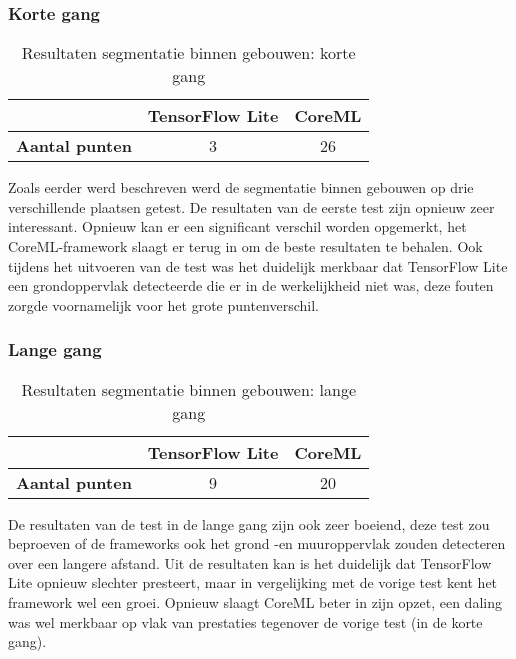 \subsubsection{Korte gang}
\begin{table}[H]
	\centering
	\begin{tabular}{|c|c|c|}
		\hline
		& \textbf{TensorFlow Lite} & \textbf{CoreML} \\ \hline
		\textbf{Aantal punten} & 3                        & 26              \\ \hline
	\end{tabular}
	\caption{Resultaten segmentatie binnen gebouwen: korte gang}
\end{table}
Zoals eerder werd beschreven werd de segmentatie binnen gebouwen op drie verschillende plaatsen getest. De resultaten van de eerste test zijn opnieuw zeer interessant. Opnieuw kan er een significant verschil worden opgemerkt, het CoreML-framework slaagt er terug in om de beste resultaten te behalen. Ook tijdens het uitvoeren van de test was het duidelijk merkbaar dat TensorFlow Lite een grondoppervlak detecteerde die er in de werkelijkheid niet was, deze fouten zorgde voornamelijk voor het grote puntenverschil.

\subsubsection{Lange gang}
\begin{table}[H]
	\centering
	\begin{tabular}{|c|c|c|}
		\hline
		& \textbf{TensorFlow Lite} & \textbf{CoreML} \\ \hline
		\textbf{Aantal punten} & 9                        & 20              \\ \hline
	\end{tabular}
	\caption{Resultaten segmentatie binnen gebouwen: lange gang}
\end{table}
De resultaten van de test in de lange gang zijn ook zeer boeiend, deze test zou beproeven of de frameworks ook het grond -en muuroppervlak zouden detecteren over een langere afstand. Uit de resultaten kan is het duidelijk dat TensorFlow Lite opnieuw slechter presteert, maar in vergelijking met de vorige test kent het framework wel een groei. Opnieuw slaagt CoreML beter in zijn opzet, een daling was wel merkbaar op vlak van prestaties tegenover de vorige test (in de korte gang).

